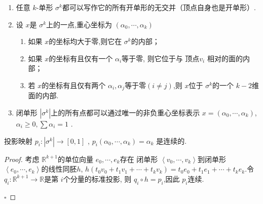\documentclass[../../几何与拓扑.tex]{subfiles}
\begin{document}
\begin{remark}
   \begin{enumerate}
    \item  任意 \(  k  \)-单形 \(   \sigma ^{k}  \)都可以写作它的所有开单形的无交并（顶点自身也是开单形）.  
    \item  设 \(  x  \)是 \(   \sigma ^{k}  \)上的一点,重心坐标为 \(  \left(  \alpha_0,\cdots,\alpha_{k}  \right)   \)  
            \begin{enumerate}
                \item 如果 \(  x  \)的坐标均大于零,则它在 \(   \sigma ^{k}  \)的内部；
                \item 如果 \(  x  \)的坐标有且仅有一个 \(  \alpha _{i}  \)等于零, 则它位于与 顶点\(  v_{i}  \) 相对的面的内部；
                \item 若 \(  x  \)的坐标有且仅有两个 \(  \alpha _{i},\alpha _{j}  \)等于零\(  \left( i\neq j \right)   \),则 \(  x  \)位于 \(   \sigma^{k}  \)的一个
                 \(  k-2  \)维面的内部.         
            \end{enumerate}
    
    \item 闭单形 \(  \left|  \sigma ^{k} \right|   \)上的所有点都可以通过唯一的非负重心坐标表示 \(  x =  \left(   \alpha_0,\cdots,\alpha_{k}  \right)   \), \(  \alpha _{i}\ge 0,\sum  \alpha _{i}= 1  \)   .
             
   \end{enumerate}
   
\end{remark}


\begin{proposition}
    投影映射 \(  p_{i}: \left|  \sigma ^{k} \right| \to [0,1]   \) , \(  p_{i}\left(  \alpha_0,\cdots,\alpha_{k}  \right)= \alpha _{k}   \) 是连续的.
\end{proposition}

\begin{proof}

    考虑 \(  \mathbb{R} ^{k+ 1}  \)的单位向量 \(   e_0,\cdots,e_{k}   \)存在 闭单形 \(  \left< v_0,\cdots,v_{k}  \right>  \)到闭单形 \(  \left< e_0,\cdots,e_{k}  \right>  \)的线性同胚\(  h  \), 
     \(  h\left( t_0v_0+ t_1v_1+ \cdots + t_{k}v_{k} \right) =  t_0e_0+ t_1e_1+ \cdots + t_{k}e_{k}   \).令 \(  q_{i} : \mathbb{R} ^{k+ 1}\to \mathbb{R}   \)是第 \(  i  \)个分量的标准投影,
     则 \(  q_{i}\circ h = p_{i}  \),因此 \(  p_{i}  \)连续.          

    \hfill $\square$
\end{proof}
\end{document}
